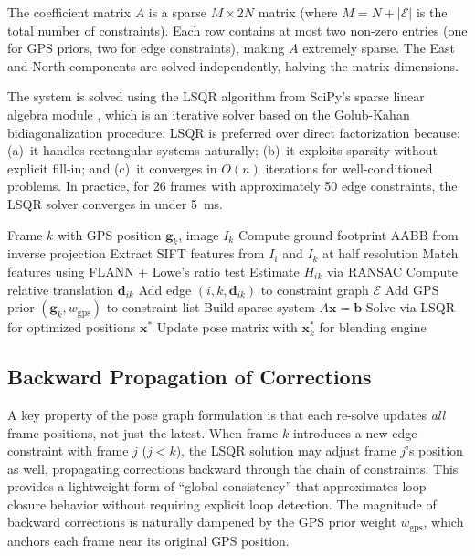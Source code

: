 \documentclass[conference]{IEEEtran}
\begin{document}
The coefficient matrix $A$ is a sparse $M \times 2N$ matrix (where $M = N + |\mathcal{E}|$ is the total number of constraints). Each row contains at most two non-zero entries (one for GPS priors, two for edge constraints), making $A$ extremely sparse. The East and North components are solved independently, halving the matrix dimensions.

The system is solved using the LSQR algorithm from SciPy's sparse linear algebra module \cite{scipy}, which is an iterative solver based on the Golub-Kahan bidiagonalization procedure. LSQR is preferred over direct factorization because: (a)~it handles rectangular systems naturally; (b)~it exploits sparsity without explicit fill-in; and (c)~it converges in $O(n)$ iterations for well-conditioned problems. In practice, for 26 frames with approximately 50 edge constraints, the LSQR solver converges in under 5~ms.

\begin{algorithm}[h]
\caption{Incremental Pose Graph Update}
\label{alg:posegraph}
\begin{algorithmic}[1]
\REQUIRE Frame $k$ with GPS position $\mathbf{g}_k$, image $I_k$
\STATE Compute ground footprint AABB from inverse projection
        \STATE Extract SIFT features from $I_i$ and $I_k$ at half resolution
        \STATE Match features using FLANN + Lowe's ratio test
            \STATE Estimate $H_{ik}$ via RANSAC
            \STATE Compute relative translation $\mathbf{d}_{ik}$
            \STATE Add edge $(i, k, \mathbf{d}_{ik})$ to constraint graph $\mathcal{E}$
        \ENDIF
    \ENDIF
\ENDFOR
\STATE Add GPS prior $(\mathbf{g}_k, w_{\text{gps}})$ to constraint list
\STATE Build sparse system $A\mathbf{x} = \mathbf{b}$
\STATE Solve via LSQR for optimized positions $\mathbf{x}^*$
\STATE Update pose matrix with $\mathbf{x}_k^*$ for blending engine
\end{algorithmic}
\end{algorithm}

\subsection{Backward Propagation of Corrections}

A key property of the pose graph formulation is that each re-solve updates \emph{all} frame positions, not just the latest. When frame $k$ introduces a new edge constraint with frame $j$ ($j < k$), the LSQR solution may adjust frame $j$'s position as well, propagating corrections backward through the chain of constraints. This provides a lightweight form of ``global consistency'' that approximates loop closure behavior without requiring explicit loop detection. The magnitude of backward corrections is naturally dampened by the GPS prior weight $w_{\text{gps}}$, which anchors each frame near its original GPS position.
\end{document}
